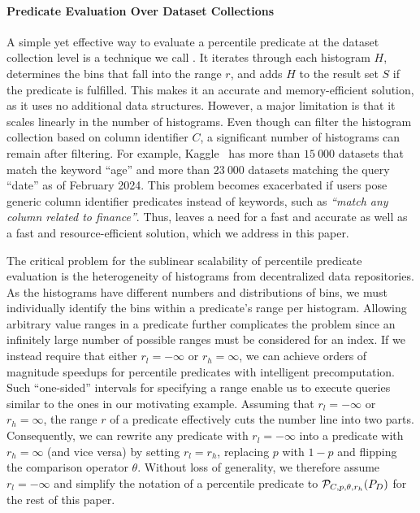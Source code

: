 \paragraph{Predicate Evaluation Over Dataset Collections}
A simple yet effective way to evaluate a percentile predicate at the dataset collection level is a technique we call \pscan.
It iterates through each histogram $H$, determines the bins that fall into the range $r$, and adds $H$ to the result set $S$ if the predicate is fulfilled.
This makes it an accurate and memory-efficient solution, as it uses no additional data structures.
However, a major limitation is that it scales linearly in the number of histograms.
Even though \pscan can filter the histogram collection based on column identifier $C$, a significant number of histograms can remain after filtering.
For example, Kaggle~\cite{kaggle_inc_kaggle_2024} has more than $15\:000$ datasets that match the keyword ``age'' and more than $23\:000$ datasets matching the query ``date'' as of February 2024.
This problem becomes exacerbated if users pose generic column identifier predicates instead of keywords, such as \textit{``match any column related to finance''}.
Thus, \pscan leaves a need for a fast and accurate as well as a fast and resource-efficient solution, which we address in this paper.

The critical problem for the sublinear scalability of percentile predicate evaluation is the heterogeneity of histograms from decentralized data repositories.
As the histograms have different numbers and distributions of bins, we must individually identify the bins within a predicate's range per histogram.
Allowing arbitrary value ranges in a predicate further complicates the problem since an infinitely large number of possible ranges must be considered for an index.
If we instead require that either $r_l = -\infty$ or $r_h = \infty$, we can achieve orders of magnitude speedups for percentile predicates with intelligent precomputation.
Such ``one-sided'' intervals for specifying a range enable us to execute queries similar to the ones in our motivating example.
Assuming that $r_l = -\infty$ or $r_h = \infty$, the range $r$ of a predicate effectively cuts the number line into two parts.
Consequently, we can rewrite any predicate with $r_l = -\infty$ into a predicate with $r_h = \infty$ (and vice versa) by setting $r_l = r_h$, replacing $p$ with $1-p$ and flipping the comparison operator $\theta$.
Without loss of generality, we therefore assume $r_l = -\infty$ and simplify the notation of a percentile predicate to $\mathcal{P}_{C, p, \theta, r_h}(P_D)$ for the rest of this paper.
